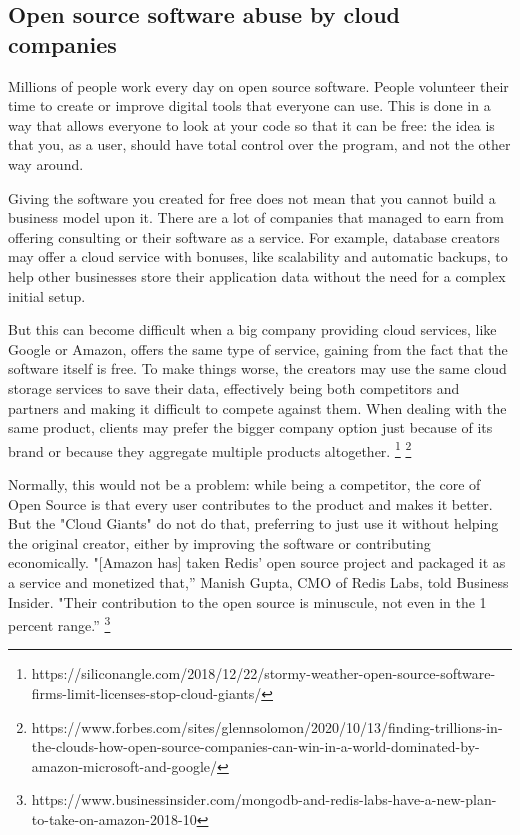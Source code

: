 \documentclass[12pt, a4paper]{article}
\begin{document}
  \subsection{Open source software abuse by cloud companies}
  Millions of people work every day on open source software. People volunteer their time to create or improve digital tools that everyone can use. This is done in a way that allows everyone to look at your code so that it can be free: the idea is that you, as a user, should have total control over the program, and not the other way around.

  Giving the software you created for free does not mean that you cannot build a business model upon it. There are a lot of companies that managed to earn from offering consulting or their software as a service. For example, database creators may offer a cloud service with bonuses, like scalability and automatic backups, to help other businesses store their application data without the need for a complex initial setup.

  But this can become difficult when a big company providing cloud services, like Google or Amazon, offers the same type of service, gaining from the fact that the software itself is free. To make things worse, the creators may use the same cloud storage services to save their data, effectively being both competitors and partners and making it difficult to compete against them. When dealing with the same product, clients may prefer the bigger company option just because of its brand or because they aggregate multiple products altogether. 
  \footnote{https://siliconangle.com/2018/12/22/stormy-weather-open-source-software-firms-limit-licenses-stop-cloud-giants/} 
  \footnote{https://www.forbes.com/sites/glennsolomon/2020/10/13/finding-trillions-in-the-clouds-how-open-source-companies-can-win-in-a-world-dominated-by-amazon-microsoft-and-google/}

  Normally, this would not be a problem: while being a competitor, the core of Open Source is that every user contributes to the product and makes it better. But the "Cloud Giants" do not do that, preferring to just use it without helping the original creator, either by improving the software or contributing economically. "[Amazon has] taken Redis' open source project and packaged it as a service and monetized that,” Manish Gupta, CMO of Redis Labs, told Business Insider. "Their contribution to the open source is minuscule, not even in the 1 percent range.” 
  \footnote{https://www.businessinsider.com/mongodb-and-redis-labs-have-a-new-plan-to-take-on-amazon-2018-10}
\end{document}
